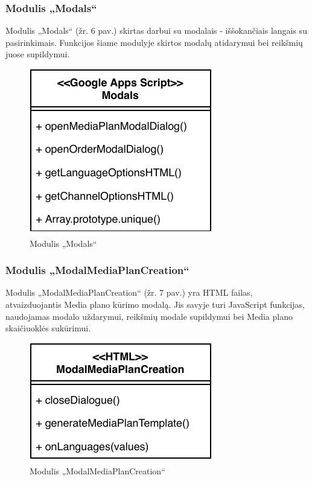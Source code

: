 \subsubsection{Modulis „Modals“}
Modulis „Modals“ (žr. 6 pav.) skirtas darbui su modalais - iššokančiais langais su pasirinkimais. Funkcijos šiame modulyje skirtos modalų atidarymui bei reikšmių juose supildymui.

\begin{figure}[H]
    \centering
    \includegraphics[scale=0.8]{Images/module-modals.pdf}
    \caption{Modulis „Modals“}
    \label{img:model}
\end{figure}

\subsubsection{Modulis „ModalMediaPlanCreation“}
Modulis „ModalMediaPlanCreation“ (žr. 7 pav.) yra HTML failas, atvaizduojantis Media plano kūrimo modalą. Jis savyje turi JavaScript funkcijas, naudojamas modalo uždarymui, reikšmių modale supildymui bei Media plano skaičiuoklės sukūrimui.

\begin{figure}[H]
    \centering
    \includegraphics[scale=0.8]{Images/module-modal-media-plan-creation.pdf}
    \caption{Modulis „ModalMediaPlanCreation“}
    \label{img:model}
\end{figure}

